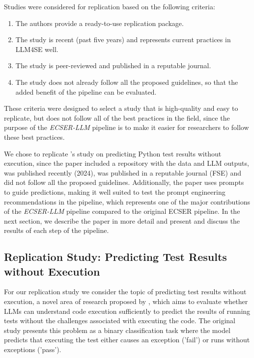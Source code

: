\documentclass[a4paper]{article}
\newcommand{\newecser}{\textit{ECSER-LLM} }
\begin{document}
Studies were considered for replication based on the following criteria:
\begin{enumerate}
	\item The authors provide a ready-to-use replication package.
	\item The study is recent (past five years) and represents current practices in LLM4SE well.
	\item The study is peer-reviewed and published in a reputable journal.
	\item The study does not already follow all the proposed guidelines, so that the added benefit of the pipeline can be evaluated.
\end{enumerate}

These criteria were designed to select a study that is high-quality and easy to replicate, but does not follow all of the best practices in the field, since the purpose of the \newecser pipeline is to make it easier for researchers to follow these best practices.

We chose to replicate \textcite{10.1145/3663529.3663794}'s study on predicting Python test results without execution, since the paper included a repository with the data and LLM outputs, was published recently (2024), was published in a reputable journal (FSE) and did not follow all the proposed guidelines. Additionally, the paper uses prompts to guide predictions, making it well suited to test the prompt engineering recommendations in the pipeline, which represents one of the major contributions of the \newecser pipeline compared to the original ECSER pipeline. In the next section, we describe the paper in more detail and present and discuss the results of each step of the pipeline.

\subsection{Replication Study: Predicting Test Results without Execution}
For our replication study we consider the topic of predicting test results without execution, a novel area of research proposed by \textcite{10.1145/3663529.3663794}, which aims to evaluate whether LLMs can understand code execution sufficiently to predict the results of running tests without the challenges associated with executing the code. The original study presents this problem as a binary classification task where the model predicts that executing the test either causes an exception ('fail') or runs without exceptions ('pass').
\end{document}
